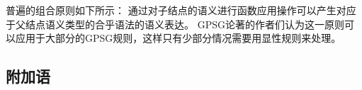 \noindent
普遍的组合原则如下所示：
\eanoraggedright
通过对子结点的语义进行函数应用操作可以产生对应于父结点语义类型的合乎语法的语义表达。
\z
GPSG论著的作者们认为这一原则可以应用于大部分的GPSG规则，这样只有少部分情况需要用显性规则来处理。

\subsection{附加语}
\label{Abschnitt-Adjunkte-GPSG}

